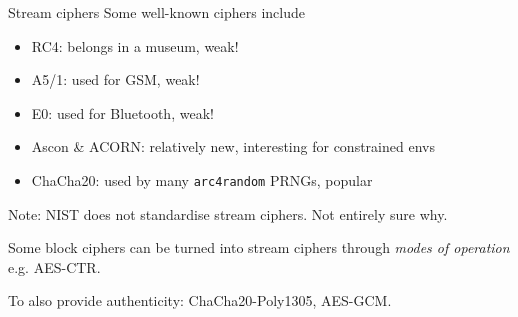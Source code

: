 \begin{frame}{Stream ciphers}
  Some well-known ciphers include
  \pause
  \begin{itemize}[<+->]
    \item RC4: belongs in a museum, weak!
    \item A5/1: used for GSM, weak!
    \item E0: used for Bluetooth, weak!
    \item Ascon \& ACORN: relatively new, interesting for constrained envs
    \item ChaCha20: used by many \texttt{arc4random} PRNGs, popular
  \end{itemize}

  \vspace*{1em}

  \pause
  Note: NIST does not standardise stream ciphers. Not entirely sure why.

  \vspace*{1em}

  \pause
  Some block ciphers can be turned into stream ciphers through \emph{modes of operation} e.g. AES-CTR.

  \vspace*{1em}

  \pause
  To also provide authenticity: ChaCha20-Poly1305, AES-GCM.
\end{frame}


